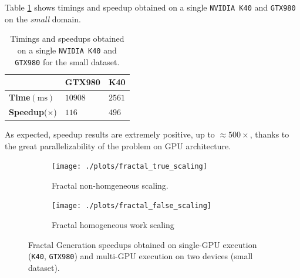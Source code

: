 Table \ref{tab:julia_single_GPU} shows timings and speedup obtained on a single \texttt{NVIDIA K40} and \texttt{GTX980} on the \textit{small} domain.
\begin{table}
    \centering
    \caption{Timings and speedups obtained on a single \texttt{NVIDIA K40} and \texttt{GTX980} for the small dataset.}
    \label{tab:julia_single_GPU}
\begin{tabular}{@{}lll@{}}
    \toprule
    & GTX980 & K40 \\ \midrule
    \textbf{Time}$(\si{\milli\second})$    & $10908$      & $2561$   \\
    \textbf{Speedup}($\times$) & $116$      & $496$  \\
    \bottomrule
\end{tabular}
\end{table}
As expected, speedup results are extremely positive, up to $\approx 500 \times$, thanks to the great parallelizability of the problem on GPU architecture.
\begin{figure}
    
    \begin{subfigure}{1.0\textwidth}
        \caption{Fractal non-homgeneous scaling.}
        \label{fig:fractal_true_scaling}
        \texttt{[image: ./plots/fractal\_true\_scaling]}
    \end{subfigure}        
    \endminipage
    
    \begin{subfigure}{1.0\textwidth}
        \caption{Fractal homogeneous work scaling}
        \label{fig:fractal_false_scaling}
        \texttt{[image: ./plots/fractal\_false\_scaling]}
    \end{subfigure}
    \endminipage\hfill
    \caption[Fractal Generation speedups obtained on single and multi GPU execution.]{Fractal Generation speedups obtained on single-GPU execution (\texttt{K40}, \texttt{GTX980}) and multi-GPU execution on two devices (small dataset).
     }
    \label{fig:fractal_scaling}
\end{figure}

